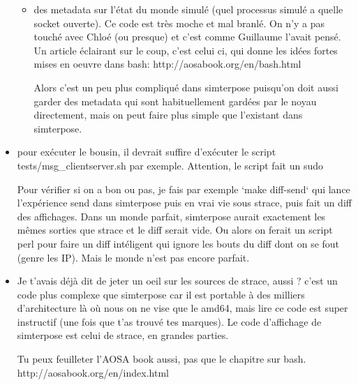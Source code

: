 \documentclass{article}
\begin{document}
\begin{itemize}
\begin{itemize}
  \item des metadata sur l'état du monde simulé (quel processus simulé a
    quelle socket ouverte). Ce code est très moche et mal branlé. On
    n'y a pas touché avec Chloé (ou presque) et c'est comme Guillaume
    l'avait pensé. Un article éclairant sur le coup, c'est celui ci,
    qui donne les idées fortes mises en oeuvre dans bash:
    http://aosabook.org/en/bash.html
    
    Alors c'est un peu plus compliqué dans simterpose puisqu'on doit
    aussi garder des metadata qui sont habituellement gardées par le
    noyau directement, mais on peut faire plus simple que l'existant
    dans simterpose.
\end{itemize}
\item pour exécuter le bousin, il devrait suffire d'exécuter le script
  tests/msg\_clientserver.sh par exemple. Attention, le script fait un sudo 
  
  Pour vérifier si on a bon ou pas, je fais par exemple `make diff-send` 
  qui lance l'expérience send dans simterpose puis en vrai
  vie sous strace, puis fait un diff des affichages. Dans un monde
  parfait, simterpose aurait exactement les mêmes sorties que strace
  et le diff serait vide. Ou alors on ferait un script perl pour faire
  un diff intéligent qui ignore les bouts du diff dont on se fout
  (genre les IP). Mais le monde n'est pas encore parfait.
  
\item Je t'avais déjà dit de jeter un oeil sur les sources de strace,
  aussi ? c'est un code plus complexe que simterpose car il est
  portable à des milliers d'architecture là où nous on ne vise que le
  amd64, mais lire ce code est super instructif (une fois que t'as
  trouvé tes marques). Le code d'affichage de simterpose est celui de
  strace, en grandes parties.
  
  Tu peux feuilleter l'AOSA book aussi, pas que le chapitre sur bash.
  http://aosabook.org/en/index.html
\end{itemize}
\end{document}
